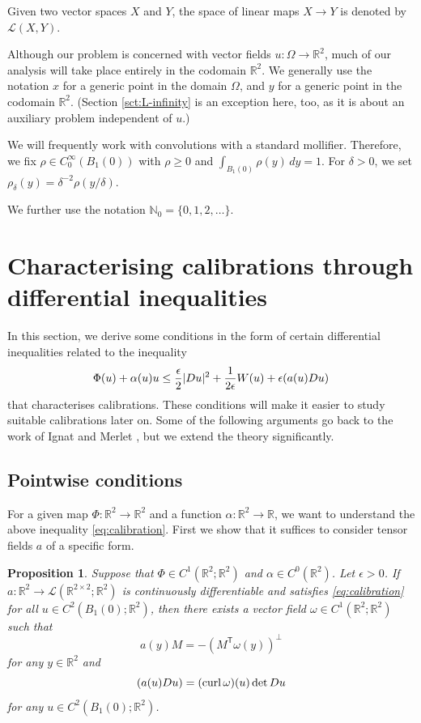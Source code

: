 \documentclass[a4paper]{article}
\newcommand{\R}{\mathbb{R}}
\newcommand{\N}{\mathbb{N}}
\newcommand{\transpose}{\mathsf{T}}
\let\div\relax\DeclareMathOperator{\div}{div}
\DeclareMathOperator{\curl}{curl}
\newtheorem{proposition}[theorem]{Proposition}
\theoremstyle{definition}
\theoremstyle{remark}
\begin{document}
Given two vector spaces $X$ and $Y$, the space of linear maps $X \to Y$ is denoted by $\mathcal{L}(X, Y)$.

Although our problem is concerned with vector fields $u \colon \Omega \to \R^2$, much of our
analysis will take place entirely in the codomain $\R^2$. We generally use the notation $x$ for
a generic point in the domain $\Omega$, and $y$ for a generic point in the codomain $\R^2$.
(Section \ref{sct:L-infinity} is an exception here, too, as it is about an auxiliary problem independent
of $u$.)

We will frequently work with convolutions with a standard mollifier. Therefore,
we fix $\rho \in C_0^\infty(B_1(0))$ with $\rho \ge 0$ and $\int_{B_1(0)} \rho(y) \, dy = 1$.
For $\delta > 0$, we set $\rho_\delta(y) = \delta^{-2} \rho(y/\delta)$.

We further use the notation $\N_0 = \{0, 1, 2, \dotsc\}$.







\section{Characterising calibrations through differential inequalities}
\label{sct:differential-inequalities}

In this section, we derive some conditions in the form of certain
differential inequalities related to the inequality
\begin{equation} \label{eq:calibration}
\div \Phi(u) + \alpha(u) \div u \le \frac{\epsilon}{2} |D u|^2 + \frac{1}{2\epsilon} W(u) + \epsilon \div(a(u) Du)
\end{equation}
that characterises calibrations.
These conditions will make it easier to study suitable
calibrations later on. Some of the following arguments go back to
the work of Ignat and Merlet \cite{Ignat-Merlet:12}, but we extend the theory significantly.


\subsection{Pointwise conditions}

For a given map $\Phi \colon \R^2 \to \R^2$ and a function $\alpha \colon \R^2 \to \R$,
we want to understand the above inequality \eqref{eq:calibration}.
First we show that it suffices to consider tensor fields $a$
of a specific form.

\begin{proposition}
Suppose that $\Phi \in C^1(\R^2; \R^2)$ and $\alpha \in C^0(\R^2)$.
Let $\epsilon > 0$. If $a \colon \R^2 \to \mathcal{L}(\R^{2 \times 2}; \R^2)$ is continuously differentiable and
satisfies \eqref{eq:calibration} for all $u \in C^2(B_1(0); \R^2)$,
then there exists a vector field $\omega \in C^1(\R^2; \R^2)$ such that
\[
a(y)M = -(M^\transpose \omega(y))^\perp
\]
for any $y \in \R^2$ and
\[
\div(a(u) Du) = (\curl \omega)(u) \det Du
\]
for any $u \in C^2(B_1(0); \R^2)$.
\end{proposition}
\end{document}
